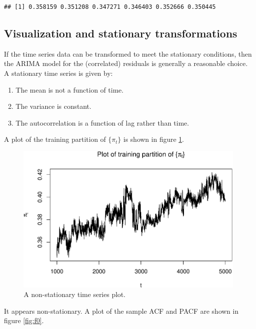 \documentclass[final,
  11pt,
]{article}
\begin{document}
\begin{verbatim}
## [1] 0.358159 0.351208 0.347271 0.346403 0.352666 0.350445
\end{verbatim}

\hypertarget{visualization-and-stationary-transformations}{%
\subsection{Visualization and stationary
transformations}\label{visualization-and-stationary-transformations}}

If the time series data can be transformed to meet the stationary
conditions, then the ARIMA model for the (correlated) residuals is
generally a reasonable choice. A stationary time series is given by:

\begin{enumerate}
\item The mean is not a function of time.
\item The variance is constant.
\item The autocorrelation is a function of lag rather than time.
\end{enumerate}

A plot of the training partition of \(\{\pi_t\}\) is shown in
figure \ref{fig:fa}.

\begin{figure}
\includegraphics{paper_files/figure-latex/unnamed-chunk-2-1.pdf}
\caption{A non-stationary time series plot.}
\label{fig:fa}
\end{figure}

It appears non-stationary.
A plot of the sample ACF and PACF are shown in figure \ref{fig:f0}.
\end{document}
